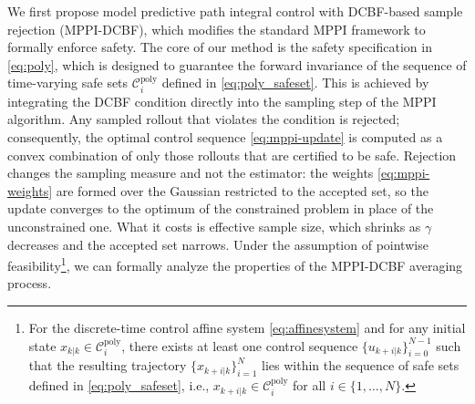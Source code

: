 \documentclass[letterpaper, 10 pt, conference]{ieeeconf}
\begin{document}
We first propose model predictive path integral control with DCBF-based sample rejection (MPPI-DCBF), which modifies the standard MPPI framework to formally enforce safety. The core of our method is the safety specification in \eqref{eq:poly}, which is designed to guarantee the forward invariance of the sequence of time-varying safe sets $\mathcal{C}_i^{\mathrm{poly}}$ defined in \eqref{eq:poly_safeset}. This is achieved by integrating the DCBF condition directly into the sampling step of the MPPI algorithm. Any sampled rollout that violates the condition is rejected; consequently, the optimal control sequence \eqref{eq:mppi-update} is computed as a convex combination of only those rollouts that are certified to be safe. {\color{blue} Rejection changes the sampling measure and not the estimator: the weights \eqref{eq:mppi-weights} are formed over the Gaussian restricted to the accepted set, so the update converges to the optimum of the constrained problem in place of the unconstrained one. What it costs is effective sample size, which shrinks as $\gamma$ decreases and the accepted set narrows.}
Under the assumption of pointwise feasibility\footnote{For the discrete-time control affine system \eqref{eq:affinesystem} and for any initial state $x_{k|k} \in \mathcal{C}_i^\mathrm{poly}$, there exists at least one control sequence $\{u_{k+i|k}\}_{i=0}^{N-1}$ such that the resulting trajectory $\{x_{k+i|k}\}_{i=1}^{N}$ lies within the sequence of safe sets defined in \eqref{eq:poly_safeset}, i.e., $x_{k+i|k} \in \mathcal{C}_i^{\mathrm{poly}}$ for all $i \in \{1, \dots, N\}$.
}, we can formally analyze the properties of the MPPI-DCBF averaging process.
\end{document}
